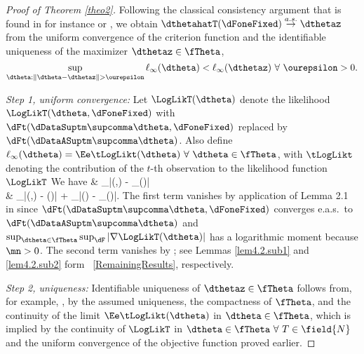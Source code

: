 \proofskip
\begin{proof}[Proof of Theorem \ref{theo2}]
Following the classical consistency argument that is found 
in for instance \citet[Theorem 3.4]{RePEc:cup:cbooks:9780521252805} or 
\citet[Theorem 3.3]{galwhitbook},
we obtain $\dthetahatT(\dFoneFixed) \stackrel{a.s.}{\to} \dthetaz$ from the uniform convergence of the criterion function
and the identifiable uniqueness of the maximizer $\dthetaz \in \fTheta$,
\begin{equation*}
\sup_{\dtheta: \| \dtheta - \dthetaz \| > \ourepsilon} \ell_{\infty}(\dtheta) < \ell_{\infty}
(\dthetaz) \ \forall \ \ourepsilon >0. 
\end{equation*} 

\textit{Step 1, uniform convergence:}
Let $\LogLikT(\dtheta)$ denote the likelihood $\LogLikT(\dtheta,\dFoneFixed)$ with 
$\dFt(\dDataSuptm\supcomma\dtheta,\dFoneFixed)$
replaced by
$\dFt(\dDataASuptm\supcomma\dtheta)$.
Also define
$ \ell_{\infty}(\dtheta)  = \Ee \tLogLikt(\dtheta) \ \forall \ \dtheta \in \fTheta$,
with $\tLogLikt$ denoting the contribution of the $t$-th observation to the 
likelihood function $\LogLikT$
We have
\bqn
\nonumber
&   \sup_{\dtheta \in \fTheta}|\LogLikT(\dtheta,\dFoneFixed) -  \ell_{\infty}(\dtheta)| \ \leq 
\\ &
\label{ineqsRao}
    \sup_{\dtheta \in \fTheta}|\LogLikT(\dtheta,\dFoneFixed) -  \LogLikT(\dtheta)| +
    \sup_{\dtheta \in \fTheta}|\LogLikT(\dtheta) -  \ell_{\infty}(\dtheta)|.
\eqn
The first term vanishes by application of Lemma 2.1 in \cite{smikosch2006} since  
$\dFt(\dDataSuptm\supcomma\dtheta,\dFoneFixed)$
converges e.a.s.~to 
$\dFt(\dDataASuptm\supcomma\dtheta)$
and $\sup_{\dtheta \in \fTheta} \sup_{\dF}|\nabla \LogLikT(\dtheta)|$ has a logarithmic moment because $\mn>0$. The second term vanishes by
 \citet{rao1962}; see Lemmas \ref{lem4.2.sub1} and \ref{lem4.2.sub2} form \SupplementaryAppendix\ \ref{RemainingResults}, respectively.


\textit{Step 2, uniqueness:}
Identifiable uniqueness of $\dthetaz \in \fTheta$ follows 
from, for example, \citet{RePEc:cup:cbooks:9780521252805},
by the assumed uniqueness, 
the compactness of $\fTheta$, 
and the continuity of the limit $\Ee\tLogLikt(\dtheta)$ in 
$\dtheta \in \fTheta$, which is implied by the continuity of 
$\LogLikT$ in $\dtheta \in \fTheta \ \forall \ T \in \field{N}$ 
and the uniform convergence of the objective function proved earlier.
\end{proof}

